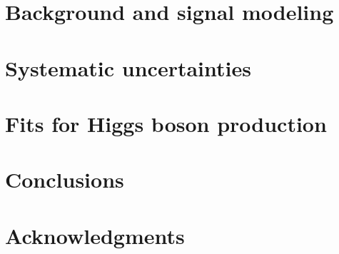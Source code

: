 \documentclass[PAPER, american,coverpage,texlive=2016, english]{\ATLASLATEXPATH atlasdoc}
\begin{document}
\section{Background and signal modeling}
\label{sec:backgrounds}



\section{Systematic uncertainties}
\label{sec:uncertainties}



\section{Fits for Higgs boson production}
\label{sec:results}

\section{Conclusions}
\label{sec:conclusion}


\section*{Acknowledgments}




\clearpage
\end{document}
